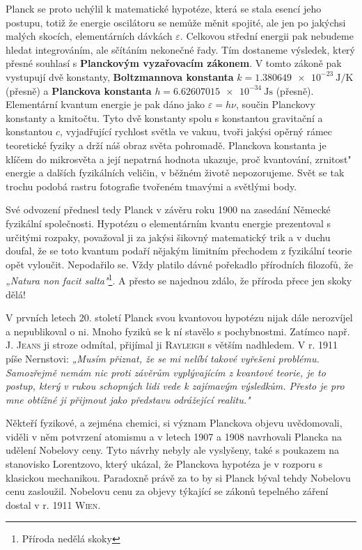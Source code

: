         Planck se proto uchýlil k matematické hypotéze, která se stala esencí jeho postupu, totiž že
        energie oscilátoru se nemůže měnit spojité, ale jen po jakýchsi malých skocích,
        elementárních dávkách \(\varepsilon\). Celkovou střední energii pak nebudeme hledat
        integrováním, ale sčítáním nekonečné řady. Tím dostaneme výsledek, který přesné souhlasí s
        \textbf{Planckovým vyzařovacím zákonem}. V tomto zákoně pak vystupují dvě konstanty,
        \textbf{Boltzmannova konstanta} \( k = \SI{1.380649e-23}{\joule\per\kelvin}\) (přesně) a
        \textbf{Planckova konstanta} \(h = \SI{6.62607015e-34}{\joule\s} \) (přesně). Elementární
        kvantum energie je pak dáno jako \(\varepsilon = h\nu\), součin Planckovy konstanty a
        kmitočtu. Tyto dvě konstanty spolu s konstantou gravitační a konstantou \(c\), vyjadřující
        rychlost světla ve vakuu, tvoři jakýsi opěrný rámec teoretické fyziky a drží náš obraz světa
        pohromadě. Planckova konstanta je klíčem do mikrosvěta a její nepatrná hodnota ukazuje, proč
        kvantování, zrnitost" energie a dalších fyzikálních veličin, v běžném životě nepozorujeme.
        Svět se tak trochu podobá rastru fotografie tvořeném tmavými a světlými body.

        Své odvození přednesl tedy Planck v závěru roku 1900 na zasedání Německé fyzikální
        společnosti. Hypotézu o elementárním kvantu energie prezentoval s určitými rozpaky,
        považoval ji za jakýsi šikovný matematický trik a v duchu doufal, že se toto kvantum podaří
        nějakým limitním přechodem z fyzikální teorie opět vyloučit. Nepodařilo se. Vždy platilo
        dávné pořekadlo přírodních filozofů, že \emph{„Natura non facit salta"}\footnote{Příroda
        nedělá skoky}. A přesto se najednou zdálo, že příroda přece jen skoky dělá!

        V prvních letech 20. století Planck svou kvantovou hypotézu nijak dále nerozvíjel a
        nepublikoval o ni. Mnoho fyziků se k ní stavělo s pochybnostmi. Zatímco např. \textsc{J.
        Jeans} ji stroze odmítal, přijímal ji \textsc{Rayleigh} s větším nadhledem. V r. 1911 píše
        Nernstovi: \emph{„Musím přiznat, že se mi nelíbí takové vyřešeni problému. Samozřejmě nemám
        nic proti závěrům vyplývajícím z kvantové teorie, je to postup, který v rukou schopných lidi
        vede k zajímavým výsledkům. Přesto je pro mne obtížné ji přijmout jako představu odrážející
        realitu."} 

        Někteří fyzikové, a zejména chemici, si význam Planckova objevu uvědomovali, viděli v něm
        potvrzení atomismu a v letech 1907 a 1908 navrhovali Plancka na udělení Nobelovy ceny. Tyto
        návrhy nebyly ale vyslyšeny, také s poukazem na stanovisko Lorentzovo, který ukázal, že
        Planckova hypotéza je v rozporu s klasickou mechanikou. Paradoxně právě za to by si Planck
        býval tehdy Nobelovu cenu zasloužil. Nobelovu cenu za objevy týkající se zákonů tepelného
        záření dostal v r. 1911 \textsc{Wien}.


